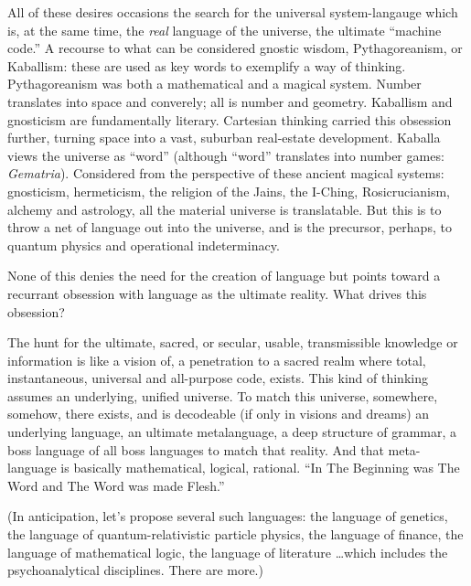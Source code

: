 All of these desires occasions the search for the universal system-langauge which is, at the same time, the \emph{real} language of the universe, the ultimate \enquote{machine code.} A recourse to what can be considered gnostic wisdom, Pythagoreanism, or Kaballism: these are used as key words to exemplify a way of thinking. Pythagoreanism was both a mathematical and a magical system. Number translates into space and converely; all is number and geometry. Kaballism and gnosticism are fundamentally literary. Cartesian thinking carried this obsession further, turning space into a vast, suburban real-estate development. Kaballa views the universe as \enquote{word} (although \enquote{word} translates into number games: \emph{Gematria}). Considered from the perspective of these ancient magical systems: gnosticism, hermeticism, the religion of the Jains, the I-Ching, Rosicrucianism, alchemy and astrology, all the material universe is translatable. But this is to throw a net of language out into the universe, and is the precursor, perhaps, to quantum physics and operational indeterminacy.

None of this denies the need for the creation of language but points toward a recurrant obsession with language as the ultimate reality. What drives this obsession?

The hunt for the ultimate, sacred, or secular, usable, transmissible knowledge or information is like a vision of, a penetration to a sacred realm where total, instantaneous, universal and all-purpose code, exists. This kind of thinking assumes an underlying, unified universe. To match this universe, somewhere, somehow, there exists, and is decodeable (if only in visions and dreams) an underlying language, an ultimate metalanguage, a deep structure of grammar, a boss language of all boss languages to match that reality. And that meta-language is basically mathematical, logical, rational. \enquote{In The Beginning was The Word and The Word was made Flesh.}

(In anticipation, let's propose several such languages: the language of genetics, the language of quantum-relativistic particle physics, the language of finance, the language of mathematical logic, the language of literature \ldots which includes the psychoanalytical disciplines. There are more.)

